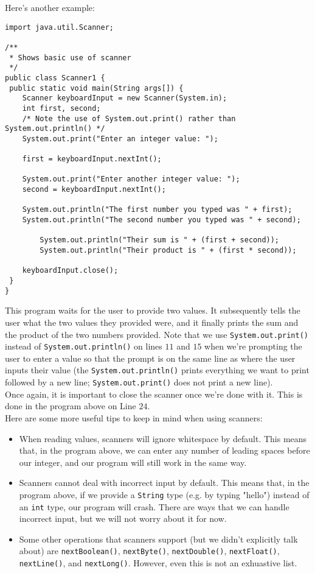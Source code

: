 Here's another example:

\begin{lstlisting}
import java.util.Scanner;

/** 
 * Shows basic use of scanner
 */
public class Scanner1 { 
 public static void main(String args[]) {
    Scanner keyboardInput = new Scanner(System.in);
    int first, second;
    /* Note the use of System.out.print() rather than System.out.println() */
    System.out.print("Enter an integer value: ");
    
    first = keyboardInput.nextInt();
    
    System.out.print("Enter another integer value: ");
    second = keyboardInput.nextInt();
    
    System.out.println("The first number you typed was " + first);
    System.out.println("The second number you typed was " + second);
    
		System.out.println("Their sum is " + (first + second));
		System.out.println("Their product is " + (first * second));
    
    keyboardInput.close();
 }
}
\end{lstlisting}

This program waits for the user to provide two values. It subsequently tells the user what the two values they provided were, and it finally prints the sum and the product of the two numbers provided. Note that we use \verb!System.out.print()! instead of \verb!System.out.println()! on lines $11$ and $15$ when we're prompting the user to enter a value so that the prompt is on the same line as where the user inputs their value (the \verb!System.out.println()! prints everything we want to print followed by a new line; \verb!System.out.print()! does not print a new line). \\  


Once again, it is important to close the scanner once we're done with it. This is done in the program above on Line $24$. \\


Here are some more useful tips to keep in mind when using scanners: 

\begin{itemize}
    \item When reading values, scanners will ignore whitespace by default. This means that, in the program above, we can enter any number of leading spaces before our integer, and our program will still work in the same way.
    \item Scanners cannot deal with incorrect input by default. This means that, in the program above, if we provide a \verb!String! type (e.g. by typing "hello") instead of an \verb!int! type, our program will crash. There are ways that we can handle incorrect input, but we will not worry about it for now. 
    \item Some other operations that scanners support (but we didn't explicitly talk about) are \verb!nextBoolean()!, \verb!nextByte()!, \verb!nextDouble()!, \verb!nextFloat()!, \verb!nextLine()!, and \verb!nextLong()!. However, even this is not an exhuastive list.
\end{itemize}


